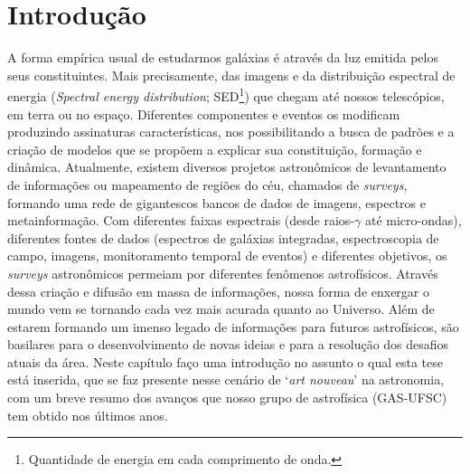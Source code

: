 



\chapter{Introdução}
\label{sec:intro}

A forma empírica usual de estudarmos galáxias é através da luz emitida pelos seus constituintes. Mais precisamente, das imagens e da distribuição espectral de energia ({\em Spectral energy distribution}; SED\footnote{Quantidade de energia em cada comprimento de onda.}) que chegam até nossos telescópios, em terra ou no espaço. Diferentes componentes e eventos os modificam produzindo assinaturas características, nos possibilitando a busca de padrões e a criação de modelos que se propõem a explicar sua constituição, formação e dinâmica. Atualmente, existem diversos projetos astronômicos de levantamento de informações ou mapeamento de regiões do céu, chamados de {\em surveys}, formando uma rede de gigantescos bancos de dados de imagens, espectros e metainformação. Com diferentes faixas espectrais (desde raios-$\gamma$ até micro-ondas), diferentes fontes de dados (espectros de galáxias integradas, espectroscopia de campo, imagens, monitoramento temporal de eventos) e diferentes objetivos, os {\em surveys} astronômicos permeiam por diferentes fenômenos astrofísicos. Através dessa criação e difusão em massa de informações, nossa forma de enxergar o mundo vem se tornando cada vez mais acurada quanto ao Universo. Além de estarem formando um imenso legado de informações para futuros astrofísicos, são basilares para o desenvolvimento de novas ideias e para a resolução dos desafios atuais da área. Neste capítulo faço uma introdução no assunto o qual esta tese está inserida, que se faz presente nesse cenário de `{\em art nouveau}' na astronomia, com um breve resumo dos avanços que nosso grupo de astrofísica (GAS-UFSC) tem obtido nos últimos anos.



